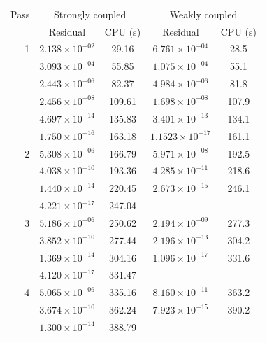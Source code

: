 \begin{table}
\begin{center}
\begin{tabular}{|r|c|c|c|c|}
  \hline
  Pass & \multicolumn{2}{c|}{Strongly coupled} &
         \multicolumn{2}{c|}{Weakly coupled}\\
  \cline{2-5} & Residual & CPU (s) & Residual & CPU (s)\\
  \hline\hline 
1     & $ 2.138\times 10^{-02}$ &   29.16   & $6.761 \times 10^{-04}$  &    28.5 \\
      & $ 3.093\times 10^{-04}$ &   55.85   & $1.075 \times 10^{-04}$  &    55.1 \\
      & $ 2.443\times 10^{-06}$ &   82.37   & $4.984 \times 10^{-06}$  &    81.8 \\
      & $ 2.456\times 10^{-08}$ &  109.61   & $1.698 \times 10^{-08}$  &   107.9 \\
      & $ 4.697\times 10^{-14}$ &  135.83   & $3.401 \times 10^{-13}$  &   134.1 \\
      & $ 1.750\times 10^{-16}$ &  163.18   & $1.1523\times 10^{-17}$  &   161.1 \\
\hline                                    
2     & $ 5.308\times 10^{-06}$ &  166.79   & $5.971 \times 10^{-08}$  &  192.5  \\
      & $ 4.038\times 10^{-10}$ &  193.36   & $4.285 \times 10^{-11}$  &  218.6  \\
      & $ 1.440\times 10^{-14}$ &  220.45   & $2.673 \times 10^{-15}$  &  246.1  \\
      & $ 4.221\times 10^{-17}$ &  247.04   & $                    $   &  \\
\hline                                    
3     & $ 5.186\times 10^{-06}$ &  250.62   & $2.194 \times 10^{-09}$  &  277.3  \\
      & $ 3.852\times 10^{-10}$ &  277.44   & $2.196 \times 10^{-13}$  &  304.2   \\
      & $ 1.369\times 10^{-14}$ &  304.16   & $1.096 \times 10^{-17}$  &  331.6   \\
      & $ 4.120\times 10^{-17}$ &  331.47   & $                    $   &  \\
\hline                                    
4     & $ 5.065\times 10^{-06}$ &  335.16   & $8.160 \times 10^{-11}$  &  363.2 \\ 
      & $ 3.674\times 10^{-10}$ &  362.24   & $7.923 \times 10^{-15}$  &  390.2 \\
      & $ 1.300\times 10^{-14}$ &  388.79   & $                    $   &  \\

\end{tabular}
\end{center}
\end{table}
